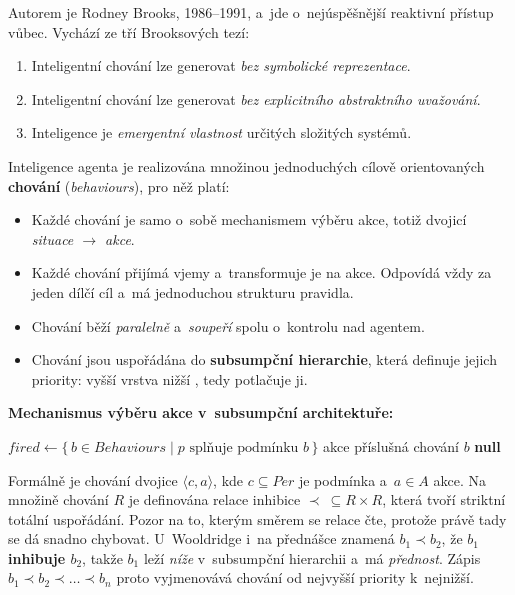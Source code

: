\documentclass[11pt,a4paper]{article}
\theoremstyle{definition}
\begin{document}
\begin{defbox}
Autorem je Rodney Brooks, 1986--1991, a~jde o~nejúspěšnější reaktivní přístup vůbec. Vychází
ze tří Brooksových tezí:
\begin{enumerate}
\item Inteligentní chování lze generovat \emph{bez symbolické reprezentace}.
\item Inteligentní chování lze generovat \emph{bez explicitního abstraktního uvažování}.
\item Inteligence je \emph{emergentní vlastnost} určitých složitých systémů.
\end{enumerate}

Inteligence agenta je realizována množinou jednoduchých cílově orientovaných \textbf{chování}
(\emph{behaviours}), pro něž platí:
\begin{itemize}
\item Každé chování je samo o~sobě mechanismem výběru akce, totiž dvojicí
  \emph{situace $\to$ akce}.
\item Každé chování přijímá vjemy a~transformuje je na akce. Odpovídá vždy za jeden dílčí cíl
  a~má jednoduchou strukturu pravidla.
\item Chování běží \emph{paralelně} a~\emph{soupeří} spolu o~kontrolu nad agentem.
\item Chování jsou uspořádána do \textbf{subsumpční hierarchie}, která definuje jejich
  priority: vyšší vrstva nižší , tedy potlačuje ji.
\end{itemize}
\end{defbox}

\noindent\textbf{Mechanismus výběru akce v~subsumpční architektuře:}
\begin{algorithmic}[1]
  \State $\mathit{fired} \gets \{\, b \in \mathit{Behaviours} \mid p \text{ splňuje podmínku } b \,\}$
      \State \Return akce příslušná chování $b$
    \EndIf
  \EndFor
  \State \Return \textbf{null} 
\EndFunction
\end{algorithmic}

Formálně je chování dvojice $\langle c, a\rangle$, kde $c \subseteq \mathit{Per}$ je podmínka
a~$a \in A$ akce. Na množině chování $R$ je definována relace inhibice
$\prec\ \subseteq R \times R$, která tvoří striktní totální uspořádání. Pozor na to, kterým
směrem se relace čte, protože právě tady se dá snadno chybovat. U~Wooldridge i~na přednášce
znamená $b_1 \prec b_2$, že \textbf{$b_1$ inhibuje $b_2$}, takže $b_1$ leží \emph{níže}
v~subsumpční hierarchii a~má \emph{přednost}. Zápis $b_1 \prec b_2 \prec \dots \prec b_n$ proto
vyjmenovává chování od nejvyšší priority k~nejnižší.
\end{document}
